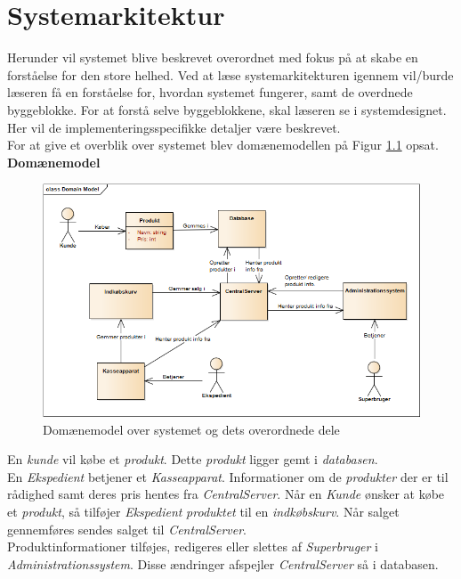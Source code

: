 \chapter{Systemarkitektur}
Herunder vil systemet blive beskrevet overordnet med fokus på at skabe en forståelse for den store helhed. Ved at læse systemarkitekturen igennem vil/burde læseren få en forståelse for, hvordan systemet fungerer, samt de overdnede byggeblokke. For at forstå selve byggeblokkene, skal læseren se i systemdesignet. Her vil de implementeringsspecifikke detaljer være beskrevet.\\

For at give et overblik over systemet blev domænemodellen på Figur \ref{fig:system_domain} opsat.\\

\textbf{Domænemodel}
\begin{figure}[H]
	\centering
	\includegraphics[scale=0.5]{Systemarkitektur/DomainModel}
	\caption{Domænemodel over systemet og dets overordnede dele}
	\label{fig:system_domain}
\end{figure}

En \textit{kunde} vil købe et \textit{produkt}. Dette \textit{produkt} ligger gemt i \textit{databasen}. \\

En \textit{Ekspedient} betjener et \textit{Kasseapparat}. Informationer om de \textit{produkter} der er til rådighed samt deres pris hentes fra \textit{CentralServer}. Når en \textit{Kunde} ønsker at købe et \textit{produkt}, så tilføjer \textit{Ekspedient} \textit{produktet}  til en \textit{indkøbskurv}. Når salget gennemføres sendes salget til \textit{CentralServer}. \\

Produktinformationer tilføjes, redigeres eller slettes af \textit{Superbruger} i \textit{Administrationssystem}. Disse ændringer afspejler \textit{CentralServer} så i databasen.

\newpage

%

\newpage
%

\newpage

